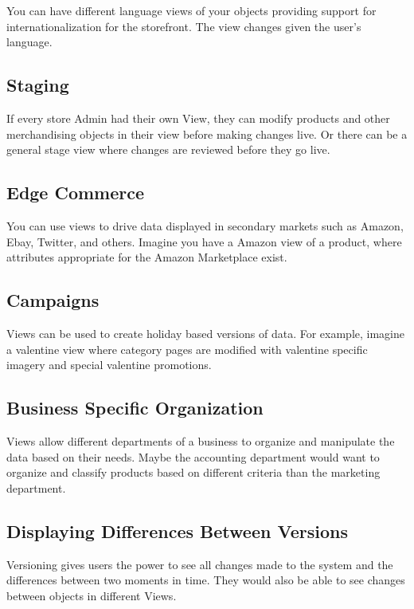\documentclass[11pt]{article}
\begin{document}
You can have different language views of your objects providing support for
internationalization for the storefront. The view changes given the user's language.

\subsection{Staging}

If every store Admin had their own View, they can modify products and other
merchandising objects in their view before making changes live. Or there can
be a general stage view where changes are reviewed before they go live.

\subsection{Edge Commerce}

You can use views to drive data displayed in secondary markets such as Amazon, Ebay,
Twitter, and others. Imagine you have a Amazon view of a product, where attributes
appropriate for the Amazon Marketplace exist.

\subsection{Campaigns}

Views can be used to create holiday based versions of data. For example, imagine
a valentine view where category pages are modified with valentine specific imagery
and special valentine promotions.

\subsection{Business Specific Organization}

Views allow different departments of a business to organize and manipulate the
data based on their needs. Maybe the accounting department would want to organize
and classify products based on different criteria than the marketing department.

\subsection{Displaying Differences Between Versions}

Versioning gives users the power to see all changes made to the system and the
differences between two moments in time. They would also be able to see changes
between objects in different Views.
\end{document}
